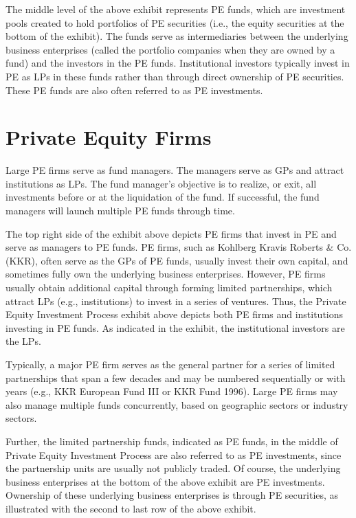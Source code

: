 \documentclass[11pt]{article}
\begin{document}
The middle level of the above exhibit represents PE funds, which are investment pools created to hold portfolios of PE securities (i.e., the equity securities at the bottom of the exhibit). The funds serve as intermediaries between the underlying business enterprises (called the portfolio companies when they are owned by a fund) and the investors in the PE funds. Institutional investors typically invest in PE as LPs in these funds rather than through direct ownership of PE securities. These PE funds are also often referred to as PE investments.

\section*{Private Equity Firms}
Large PE firms serve as fund managers. The managers serve as GPs and attract institutions as LPs. The fund manager's objective is to realize, or exit, all investments before or at the liquidation of the fund. If successful, the fund managers will launch multiple PE funds through time.

The top right side of the exhibit above depicts PE firms that invest in PE and serve as managers to PE funds. PE firms, such as Kohlberg Kravis Roberts \& Co. (KKR), often serve as the GPs of PE funds, usually invest their own capital, and sometimes fully own the underlying business enterprises. However, PE firms usually obtain additional capital through forming limited partnerships, which attract LPs (e.g., institutions) to invest in a series of ventures. Thus, the Private Equity Investment Process exhibit above depicts both PE firms and institutions investing in PE funds. As indicated in the exhibit, the institutional investors are the LPs.

Typically, a major PE firm serves as the general partner for a series of limited partnerships that span a few decades and may be numbered sequentially or with years (e.g., KKR European Fund III or KKR Fund 1996). Large PE firms may also manage multiple funds concurrently, based on geographic sectors or industry sectors.

Further, the limited partnership funds, indicated as PE funds, in the middle of Private Equity Investment Process are also referred to as PE investments, since the partnership units are usually not publicly traded. Of course, the underlying business enterprises at the bottom of the above exhibit are PE investments. Ownership of these underlying business enterprises is through PE securities, as illustrated with the second to last row of the above exhibit.
\end{document}
